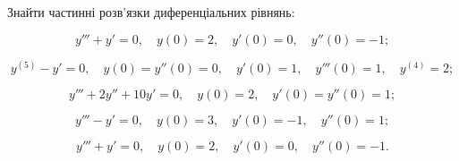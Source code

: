 Знайти частинні розв'язки диференціальних рівнянь:
\begin{problem}
	\[y'''+y'=0, \quad y(0)=2, \quad y'(0)=0, \quad y''(0)=-1;\]
\end{problem}

\begin{problem}
	\[y^{(5)}-y'=0, \quad y(0)=y''(0)=0, \quad y'(0)=1, \quad y'''(0)=1, \quad y^{(4)}=2;\]
\end{problem}

\begin{problem}
	\[y'''+2y''+10y'=0, \quad y(0)=2, \quad y'(0)=y''(0)=1;\]
\end{problem}

\begin{problem}
	\[y'''-y'=0, \quad y(0)=3, \quad y'(0)=-1, \quad y''(0)=1;\]
\end{problem}

\begin{problem}
	\[y'''+y'=0, \quad y(0)=2, \quad y'(0)=0, \quad y''(0)=-1.\]
\end{problem}